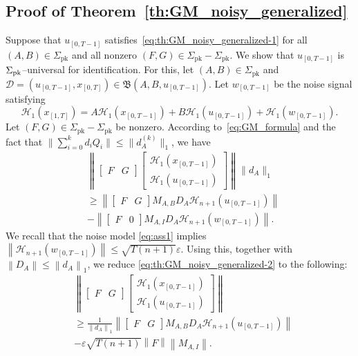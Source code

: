 \documentclass[journal,twoside,web]{ieeecolor}
\newcommand{\norm}[1]{\left\|#1\right\|}
\begin{document}
\subsection{Proof of Theorem~\ref{th:GM_noisy_generalized}}

Suppose that $u_{[0,T-1]}$ satisfies~\eqref{eq:th:GM_noisy_generalized-1} for all $(A,B)\in\Sigma_\text{pk}$ and all nonzero $(F,G)\in\Sigma_\text{pk}-\Sigma_\text{pk}$. We show that $u_{[0,T-1]}$ is $\Sigma_\textup{pk}$--universal for identification. For this, let $(A,B)\in\Sigma_\text{pk}$ and \mbox{$\mathcal{D}=(u_{[0,T-1]},x_{[0,T]})\in\mathfrak{B}(A,B,u_{[0,T-1]})$}. Let $w_{[0,T-1]}$ be the noise signal satisfying 
\begin{equation}
\mathcal{H}_1(x_{[1,T]})\!=\!A\mathcal{H}_1(x_{[0,T-1]})+B\mathcal{H}_1(u_{[0,T-1]})+\mathcal{H}_1(w_{[0,T-1]}).
\end{equation}
Let $(F,G)\in\Sigma_\text{pk}-\Sigma_\text{pk}$ be nonzero. According to~\eqref{eq:GM_formula} and the fact that $\|\sum_{i=0}^{k}d_iQ_i\|\leq\|d_A^{(k)}\|_1$, we have
\begin{equation}
\label{eq:th:GM_noisy_generalized-2}
\begin{split}
&\norm{\begin{bmatrix}
F & G
\end{bmatrix}\begin{bmatrix}
\mathcal{H}_{1}(x_{[0,T-1]}) \\ \mathcal{H}_{1}(u_{[0,T-1]})
\end{bmatrix}}\|d_A\|_1\\
&\geq\norm{\begin{bmatrix}
F & G
\end{bmatrix}M_{A,B}D_A\mathcal{H}_{n+1}(u_{[0,T-1]})
}\\
&-\norm{\begin{bmatrix}
F & 0
\end{bmatrix}M_{A,I}D_A\mathcal{H}_{n+1}(w_{[0,T-1]})}.
\end{split}
\end{equation}
We recall that the noise model \eqref{eq:ass1} implies $\norm{\mathcal{H}_{n+1}(w_{[0,T-1]})}\leq \sqrt{T(n+1)}\varepsilon$. Using this, together with $\norm{D_A}\leq\norm{d_A}_1$, we reduce \eqref{eq:th:GM_noisy_generalized-2} to the following:
\begin{equation}
\label{eq:th:GM_noisy_generalized-3}
\begin{split}
&\norm{\begin{bmatrix}
F & G
\end{bmatrix}\begin{bmatrix}
\mathcal{H}_{1}(x_{[0,T-1]}) \\ \mathcal{H}_{1}(u_{[0,T-1]})
\end{bmatrix}}\\
&\geq\tfrac{1}{\norm{d_A}_1}\norm{\begin{bmatrix}
F & G
\end{bmatrix}M_{A,B}D_A\mathcal{H}_{n+1}(u_{[0,T-1]})
}\\
&-\varepsilon\sqrt{T(n+1)}\norm{F}\norm{M_{A,I}}.
\end{split}
\end{equation}
\end{document}
